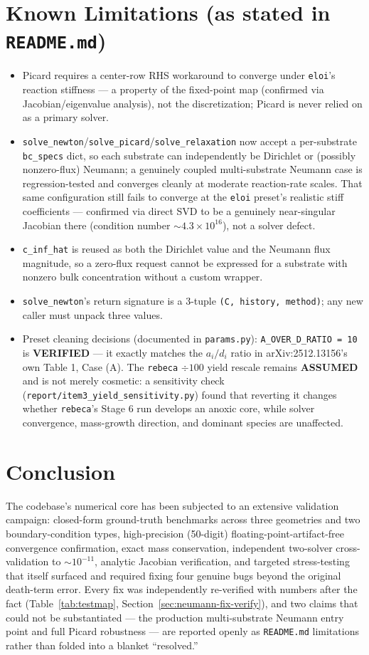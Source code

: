 \documentclass[11pt]{article}
\newcommand{\verified}{\textcolor{green!45!black}{\textbf{VERIFIED}}}
\newcommand{\assumed}{\textcolor{orange!70!black}{\textbf{ASSUMED}}}
\newcommand{\code}[1]{\texttt{#1}}
\begin{document}
\section{Known Limitations (as stated in \code{README.md})}
\begin{itemize}
\item Picard requires a center-row RHS workaround to converge under
\code{eloi}'s reaction stiffness --- a property of the fixed-point map
(confirmed via Jacobian/eigenvalue analysis), not the discretization; Picard
is never relied on as a primary solver.
\item \code{solve\_newton}/\code{solve\_picard}/\code{solve\_relaxation} now
accept a per-substrate \code{bc\_specs} dict, so each substrate can
independently be Dirichlet or (possibly nonzero-flux) Neumann; a genuinely
coupled multi-substrate Neumann case is regression-tested and converges
cleanly at moderate reaction-rate scales. That same configuration still fails
to converge at the \code{eloi} preset's realistic stiff coefficients ---
confirmed via direct SVD to be a genuinely near-singular Jacobian there
(condition number $\sim4.3\times10^{16}$), not a solver defect.
\item \code{c\_inf\_hat} is reused as both the Dirichlet value and the
Neumann flux magnitude, so a zero-flux request cannot be expressed for a
substrate with nonzero bulk concentration without a custom wrapper.
\item \code{solve\_newton}'s return signature is a 3-tuple
\code{(C, history, method)}; any new caller must unpack three values.
\item Preset cleaning decisions (documented in \code{params.py}):
\code{A\_OVER\_D\_RATIO = 10} is \verified{} --- it exactly matches the
$a_i/d_i$ ratio in arXiv:2512.13156's own Table 1, Case (A). The \code{rebeca}
$\div100$ yield rescale remains \assumed{} and is not merely cosmetic: a
sensitivity check (\code{report/item3\_yield\_sensitivity.py}) found that
reverting it changes whether \code{rebeca}'s Stage 6 run develops an anoxic
core, while solver convergence, mass-growth direction, and dominant species
are unaffected.
\end{itemize}

\section{Conclusion}
The codebase's numerical core has been subjected to an extensive validation
campaign: closed-form ground-truth benchmarks across three geometries and two
boundary-condition types, high-precision (50-digit) floating-point-artifact-free
convergence confirmation, exact mass conservation, independent two-solver
cross-validation to $\sim10^{-11}$, analytic Jacobian verification, and
targeted stress-testing that itself surfaced and required fixing four genuine
bugs beyond the original death-term error. Every fix was independently
re-verified with numbers after the fact (Table~\ref{tab:testmap},
Section~\ref{sec:neumann-fix-verify}), and two claims that could not be
substantiated --- the production multi-substrate Neumann entry point and full
Picard robustness --- are reported openly as \code{README.md} limitations
rather than folded into a blanket ``resolved.''
\end{document}
